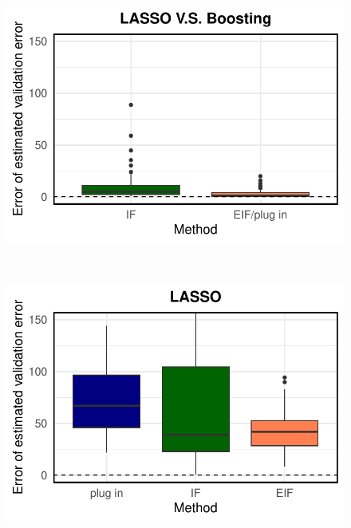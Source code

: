 \begin{figure}[ht]
\begin{minipage}{0.3\textwidth}
                \includegraphics[clip, trim = 0cm 0cm 0cm 0cm, width = \textwidth]{plot/ACIC_nonlinear_propensity_linear_HTE_estimator_error_LASSO_V.S._Boosting.pdf}
        \end{minipage}        
              \\
        \begin{minipage}{0.3\textwidth}
                \centering
                \includegraphics[clip, trim = 0cm 0cm 0cm 0cm, width = \textwidth]{plot/ACIC_nonlinear_propensity_nonlinear_HTE_estimator_error_LASSO.pdf}
        \end{minipage}
        \begin{minipage}{0.3\textwidth}
                \centering

\end{minipage}
\end{figure}
